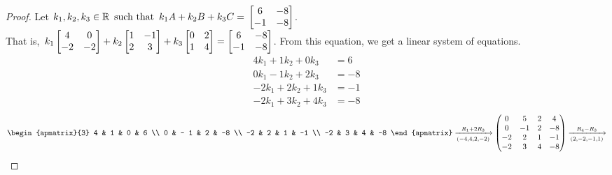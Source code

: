 \documentclass{article}
\begin{document}
\begin{enumerate}
    \begin{proof}
        Let $k_1,k_2,k_3 \in \mathbb{R} \operatorname{~\text{such that}~} k_1A + k_2B + k_3C = \operatorname{\displaystyle} \begin{bmatrix} 6 & -8 \\ -1 & -8 \end{bmatrix}$. \\ That is, $\operatorname{\displaystyle} k_1\begin{bmatrix}4  & 0  \\-2 & -2\end{bmatrix} + k_2\begin{bmatrix}1 & -1 \\2 & 3\end{bmatrix} + k_3\begin{bmatrix}0 & 2 \\1 & 4\end{bmatrix} = \begin{bmatrix} 6 & -8 \\ -1 & -8 \end{bmatrix}$. From this equation, we get a linear system of equations.
        \begin{align*}
            4k_1 + 1k_2 + 0k_3  & = 6  \\
            0k_1 - 1k_2 + 2k_3  & = -8 \\
            -2k_1 + 2k_2 + 1k_3 & = -1 \\
            -2k_1 + 3k_2 + 4k_3 & = -8
        \end{align*}
        \[
            \begin{apmatrix}{3}
                4 & 1 & 0 & 6 \\
                0 & - 1 & 2 & -8 \\
                -2 & 2 & 1 & -1 \\
                -2 & 3 & 4 & -8
            \end{apmatrix} \xrightarrow[(-4,4,2,-2)]{R_1 + 2R_3}
            \begin{pmatrix}
                0  & 5   & 2 & 4  \\
                0  & - 1 & 2 & -8 \\
                -2 & 2   & 1 & -1 \\
                -2 & 3   & 4 & -8
            \end{pmatrix} \xrightarrow[(2,-2,-1,1)]{R_4 - R_3}
\]
\end{proof}
\end{enumerate}
\end{document}
